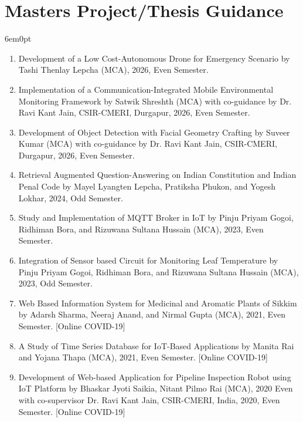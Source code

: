 \documentclass[11pt,a4paper]{moderncv}
\begin{document}
\section{\textbf{Masters Project/Thesis Guidance}}

\begin{adjustwidth}{6em}{0pt}
	\begin{enumerate}
		
		
		\item Development of a Low Cost-Autonomous Drone for Emergency Scenario by Tashi Thenlay Lepcha (MCA), 2026, Even Semester.
		
		\item Implementation of a Communication-Integrated Mobile Environmental Monitoring Framework by Satwik Shreshth (MCA) with co-guidance by Dr. Ravi Kant Jain, CSIR-CMERI, Durgapur, 2026, Even Semester.
		
		\item Development of Object Detection with Facial Geometry Crafting by Suveer Kumar (MCA) with co-guidance by Dr. Ravi Kant Jain, CSIR-CMERI, Durgapur, 2026, Even Semester.
		
	
		\item Retrieval Augmented Question-Answering on Indian Constitution and Indian Penal Code by Mayel Lyangten Lepcha, Pratiksha Phukon, and Yogesh Lokhar, 2024, Odd Semester.
		
		\item Study and Implementation of MQTT Broker in IoT by Pinju Priyam Gogoi, Ridhiman Bora, and Rizuwana Sultana Hussain (MCA), 2023, Even Semester.
			
		\item Integration of Sensor based Circuit for Monitoring Leaf Temperature by Pinju Priyam Gogoi, Ridhiman Bora, and Rizuwana Sultana Hussain (MCA), 2023, Odd Semester.
		
		\item Web Based Information System for Medicinal and Aromatic Plants of Sikkim by Adarsh Sharma, Neeraj Anand, and Nirmal Gupta (MCA), 2021, Even Semester. [Online COVID-19]
		
		\item A Study of Time Series Database for IoT-Based Applications by Manita Rai and Yojana Thapa (MCA), 2021, Even Semester. [Online COVID-19]
		
		\item Development of Web-based Application for Pipeline Inspection Robot using IoT Platform by Bhaskar Jyoti Saikia, Nitant Pilmo Rai (MCA), 2020 Even with co-supervisor Dr. Ravi Kant Jain, CSIR-CMERI, India, 2020, Even Semester. [Online COVID-19]
		

\end{enumerate}
\end{adjustwidth}
\end{document}
